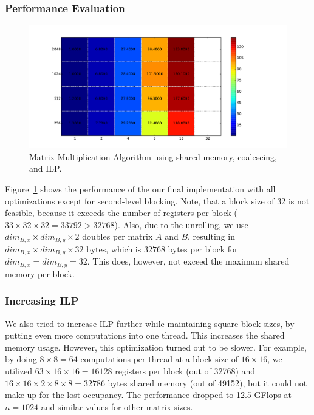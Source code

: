 \documentclass[12pt]{article}
\begin{document}
\subsubsection{Performance Evaluation}
\begin{figure}[H]
\includegraphics[width=\textwidth]{unrolled_a_b.pdf}
\caption{Matrix Multiplication Algorithm using shared memory, coalescing, and ILP.}
\label{fig:blocked_performance}
\end{figure}

Figure~\ref{fig:blocked_performance} shows the performance of the our final implementation with all optimizations except for second-level blocking. Note, that a block size of 32 is not feasible, because it exceeds the number of registers per block ($33 \times 32 \times 32 = 33792 > 32768$). Also, due to the unrolling, we use $\mathit{dim}_{B,x} \times \mathit{dim}_{B,y} \times 2$ doubles per matrix $A$ and $B$, resulting in $\mathit{dim}_{B,x} \times \mathit{dim}_{B,y} \times 32$ bytes, which is $32768$ bytes per block for $\mathit{dim}_{B,x} = \mathit{dim}_{B,y} = 32$. This does, however, not exceed the maximum shared memory per block.

\subsubsection{Increasing ILP}
We also tried to increase ILP further while maintaining square block sizes, by putting even more computations into one thread. This increases the shared memory usage. However, this optimization turned out to be slower. For example, by doing $8 \times 8 = 64$ computations per thread at a block size of $16 \times 16$, we utilized $63 \times 16 \times 16 = 16128$ registers per block (out of 32768) and $16 \times 16 \times 2 \times 8 \times 8 = 32786$ bytes shared memory (out of 49152), but it could not make up for the lost occupancy. The performance dropped to 12.5 GFlops at $n=1024$ and similar values for other matrix sizes.
\end{document}
